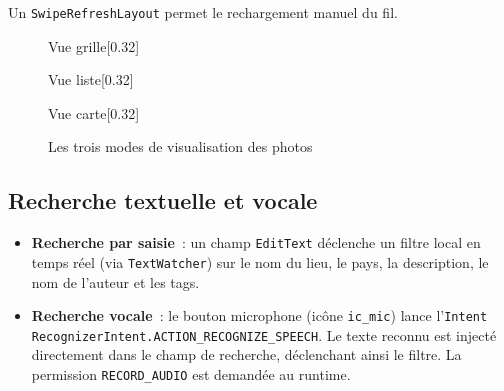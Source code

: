 \documentclass[12pt, a4paper]{report}
\begin{document}
Un \texttt{SwipeRefreshLayout} permet le rechargement manuel du fil.

\begin{figure}[H]
  \centering
  \begin{subcaptionbox}{Vue grille\label{fig:home_grid}}[0.32\textwidth]
  \end{subcaptionbox}
  \hfill
  \begin{subcaptionbox}{Vue liste\label{fig:home_list}}[0.32\textwidth]
  \end{subcaptionbox}
  \hfill
  \begin{subcaptionbox}{Vue carte\label{fig:home_map}}[0.32\textwidth]
  \end{subcaptionbox}
  \caption{Les trois modes de visualisation des photos}
  \label{fig:home_views}
\end{figure}

\subsection{Recherche textuelle et vocale}

\begin{itemize}
  \item \textbf{Recherche par saisie}~: un champ \texttt{EditText} déclenche un filtre
        local en temps réel (via \texttt{TextWatcher}) sur le nom du lieu, le pays, la
        description, le nom de l'auteur et les tags.
  \item \textbf{Recherche vocale}~: le bouton microphone (icône \texttt{ic\_mic}) lance
        l'\texttt{Intent} \texttt{RecognizerIntent.ACTION\_RECOGNIZE\_SPEECH}. Le texte
        reconnu est injecté directement dans le champ de recherche, déclenchant ainsi le
        filtre. La permission \texttt{RECORD\_AUDIO} est demandée au runtime.
\end{itemize}
\end{document}
